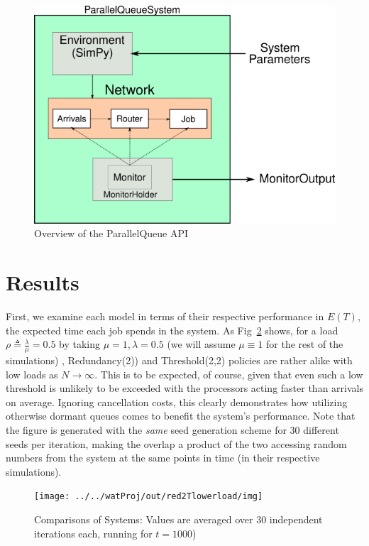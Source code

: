 \begin{figure}
    \centering
    \includegraphics[scale=0.7]{pq.png}
    \caption{Overview of the ParallelQueue API}
    \label{fig:API}
\end{figure}


\section{Results}\label{sec:results}
First, we examine each model in terms of their respective performance in $E(T)$, the expected time each job spends in the system.  
As Fig~\ref{fig:img} shows, for a load $\rho \triangleq \frac{\lambda}{\mu} = 0.5$ by taking $\mu=1, \lambda = 0.5$ (we will assume $\mu \equiv 1$ for the
rest of the simulations) , Redundancy(2)) and Threshold(2,2) policies are rather alike with low loads as $N \rightarrow \infty$. This is to be expected, of course, given that even such a low threshold is unlikely to be exceeded with the processors acting faster than arrivals on average. Ignoring cancellation costs, this clearly demonstrates how utilizing otherwise dormant queues comes to benefit the system's performance. Note that the figure is generated with the \textit{same} seed generation scheme for 30 different seeds per iteration, making the overlap a product of  the two accessing random numbers from the system at the same points in time (in their respective simulations).

\begin{figure}
	\centering
	\texttt{[image: ../../watProj/out/red2Tlowerload/img]}
	\caption{Comparisons of Systems: Values are averaged over 30 independent iterations each, running for $t=1000$)}
	\label{fig:img}
\end{figure}

